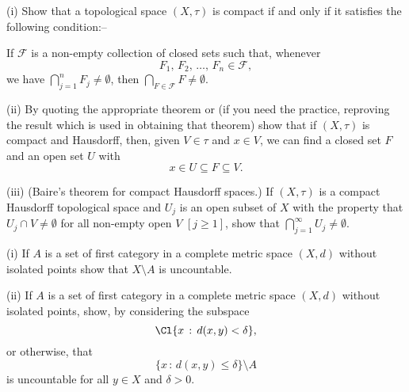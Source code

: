 \begin{exercise}\label{E;Baire compact}\label{C2.5}
(i) Show that a topological space $(X,\tau)$ 
is compact if and only if
it satisfies the following condition:--

If ${\mathcal F}$ is a non-empty collection of closed sets
such that, whenever 
\[F_{1},\,F_{2},\,\dots,\,F_{n}\in{\mathcal F},\]
we have $\bigcap_{j=1}^{n}F_{j}\neq\emptyset$, then
$\bigcap_{F\in{\mathcal F}}F\neq\emptyset$.

(ii) By quoting the appropriate theorem or (if you need the
practice, reproving the result which is used in obtaining that
theorem) show that if $(X,\tau)$ is compact and Hausdorff,
then, given $V\in\tau$ and $x\in V$, we can find a closed set $F$
and an open set $U$ with
\[x\in U\subseteq F\subseteq V.\]

(iii) (Baire's theorem for compact Hausdorff spaces.)
If $(X,\tau)$ is a compact Hausdorff topological space
and $U_{j}$ is an open subset of $X$ 
with the property that $U_{j}\cap V\neq\emptyset$  for all 
non-empty open $V$ $[j\geq 1]$, show that
$\bigcap_{j=1}^{\infty}U_{j}\neq\emptyset$.
\end{exercise}
\begin{exercise}\label{C2.6} (i) If $A$ is a set of first category
in a complete metric space $(X,d)$ without isolated points
show that $X\setminus A$ is uncountable.

(ii) If $A$ is a set of first category
in a complete metric space $(X,d)$ without isolated points,
show, by considering the subspace
\[\Cl\{x\,:\,d(x,y)<\delta\},\]
or otherwise, that
\[\{x\,:\,d(x,y)\leq \delta\}\setminus A\]
is uncountable for all $y\in X$ and $\delta>0$.

\end{exercise}
